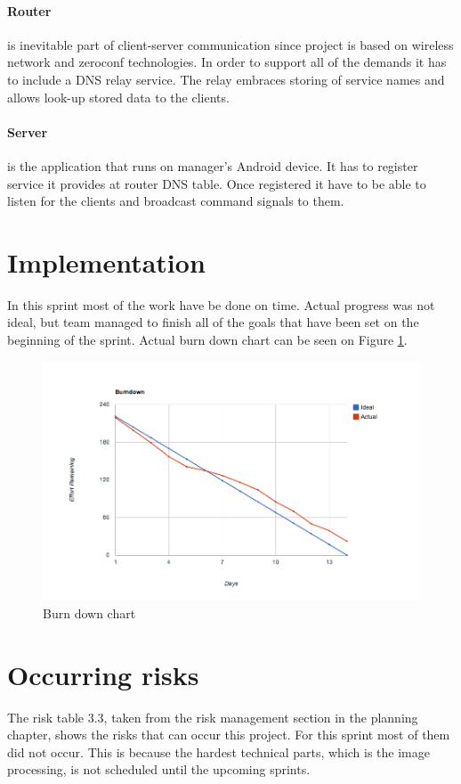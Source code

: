 \paragraph{Router}
is inevitable part of client-server communication since project is based on wireless network and zeroconf technologies. In order to support all of the demands it has to include a DNS relay service. The relay embraces storing of service names and allows look-up stored data to the clients.

\paragraph{Server}
is the application that runs on manager's Android device. It has to register service it provides at router DNS table. Once registered it have to be able to listen for the clients and broadcast command signals to them.


\section{Implementation}

In this sprint most of the work have be done on time. Actual progress was not ideal, but team managed to finish all of the goals that have been set on the beginning of the sprint.
Actual burn down chart can be seen on Figure \ref{fig:Burn1}.  

\begin{figure}[H]
	\centering
		\includegraphics[width=18cm]{sprint1/BurndownSprint1.png}
	\caption{Burn down chart}
	\label{fig:Burn1}
\end{figure}


\section{Occurring risks}
The risk table 3.3, taken from the risk management section in the planning chapter, shows the risks that can occur this project. 
For this sprint most of them did not occur. 
This is because the hardest technical parts, which is the image processing, is not scheduled until the upcoming sprints. 

